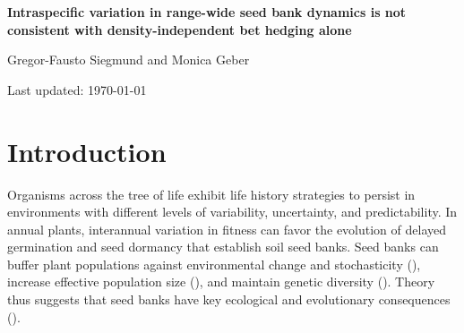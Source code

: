 \documentclass[12pt, oneside, titlepage]{article}   	%
\begin{document}
\begin{titlepage}
   \begin{center}
       \vspace*{1cm}
 
       \textbf{Intraspecific variation in range-wide seed bank dynamics is not consistent with density-independent bet hedging alone}
 
       \vspace{1.5cm}
 
       Gregor-Fausto Siegmund and Monica Geber
 
   	Last updated: \today
	

	
 
   \end{center}
\end{titlepage}
%

\section{Introduction}

Organisms across the tree of life exhibit life history strategies to persist in environments with different levels of variability, uncertainty, and predictability. In annual plants, interannual variation in fitness can favor the evolution of delayed germination and seed dormancy that establish soil seed banks. Seed banks can buffer plant populations against environmental change and stochasticity (\cite{eager2014,paniw2017}), increase effective population size (\cite{nunney2002,waples2006}), and maintain genetic diversity (\cite{mccue1998}). Theory thus suggests that seed banks have key ecological and evolutionary consequences (\cite{evans2005}). 
\end{document}
